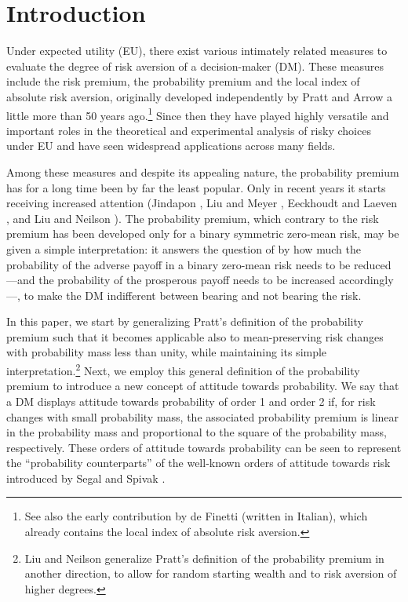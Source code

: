 \documentclass[11pt]{article}
\begin{document}
\makeatletter
\makeatother
\maketitle

\newpage

\onehalfspacing


\setcounter{equation}{0}

\section{Introduction}\label{sec:intro}

Under expected utility (EU), there exist various intimately related 
measures
to evaluate the degree of risk aversion of a decision-maker (DM).
These measures include the risk premium, the probability premium and the local index of absolute risk aversion, originally developed independently
by Pratt \cite{P64} and Arrow \cite{A65,A71} a little more than 50 years ago.\footnote{See also the early contribution by 
de Finetti \cite{dF52} (written in Italian), which already contains the local index of absolute risk aversion.} 
Since then they have played highly versatile 
and important roles in the theoretical and experimental analysis of risky choices under EU
and have seen widespread applications across many fields.

Among these measures and despite its appealing nature, the probability premium 
has for a long time been by far the least popular. 
Only in recent years it starts receiving increased attention 
(Jindapon \cite{J10}, Liu and Meyer \cite{LM13}, Eeckhoudt and Laeven \cite{EL15}, and Liu and Neilson \cite{LN19}).
The probability premium, 
which contrary to the risk premium has been developed only for a binary symmetric zero-mean risk,
may be given a simple 
interpretation:
it answers the question of by how much the probability of the adverse payoff in a binary zero-mean risk needs to be reduced---and
the probability of the prosperous payoff needs to be increased accordingly---,
to make the DM indifferent between bearing and not bearing the risk.

In this paper, we start by generalizing Pratt's \cite{P64} definition of the probability premium such that it becomes
applicable also to mean-preserving risk changes with probability mass less than unity,
while maintaining its simple interpretation.\footnote{Liu and Neilson \cite{LN15,LN19}
generalize Pratt's definition of the probability premium in another direction,
to allow for random starting wealth and to risk aversion of higher degrees.}
Next, we employ this general 
definition of the probability premium 
to introduce a new concept of attitude towards probability.
We say that a DM displays attitude towards probability of order 1 and order 2 if,
for risk changes with small probability mass,
the associated probability premium is linear in the probability mass and proportional to the square of the probability mass, respectively.
These orders of attitude towards probability can be seen to represent the ``probability counterparts''
of the well-known orders of attitude towards risk introduced by Segal and Spivak \cite{SS90}.
\end{document}

